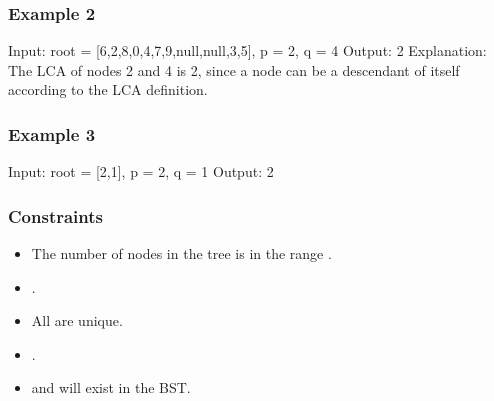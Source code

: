 \documentclass[letterpaper,12pt,english]{book}
\begin{document}
\subsubsection{Example 2}
\label{\detokenize{Binary_Tree/235_Lowest_Common_Ancestor_of_a_Binary_Search_Tree:example-2}}
\sphinxAtStartPar
{}

\begin{sphinxVerbatim}[commandchars=\\\{\}]
Input: root = [6,2,8,0,4,7,9,null,null,3,5], p = 2, q = 4
Output: 2
Explanation: The LCA of nodes 2 and 4 is 2, since a node can be a descendant of itself according to the LCA definition.
\end{sphinxVerbatim}


\subsubsection{Example 3}
\label{\detokenize{Binary_Tree/235_Lowest_Common_Ancestor_of_a_Binary_Search_Tree:example-3}}
\begin{sphinxVerbatim}[commandchars=\\\{\}]
Input: root = [2,1], p = 2, q = 1
Output: 2
\end{sphinxVerbatim}


\subsubsection{Constraints}
\label{\detokenize{Binary_Tree/235_Lowest_Common_Ancestor_of_a_Binary_Search_Tree:constraints}}\begin{itemize}
\item {} 
\sphinxAtStartPar
The number of nodes in the tree is in the range \sphinxcode{\sphinxupquote{{[}2, 10\textasciicircum{}5{]}}}.

\item {} 
\sphinxAtStartPar
{}.

\item {} 
\sphinxAtStartPar
All  are unique.

\item {} 
\sphinxAtStartPar
{}.

\item {} 
\sphinxAtStartPar
{} and  will exist in the BST.

\end{itemize}
\end{document}
